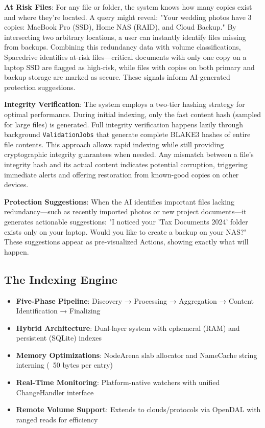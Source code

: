 \documentclass[sigconf]{acmart}
\begin{document}
\textbf{At Risk Files}: For any file or folder, the system knows how many copies exist and where they're located. A query might reveal: "Your wedding photos have 3 copies: MacBook Pro (SSD), Home NAS (RAID), and Cloud Backup." By intersecting two arbitrary locations, a user can instantly identify files missing from backups. Combining this redundancy data with volume classifications, Spacedrive identifies at-risk files—critical documents with only one copy on a laptop SSD are flagged as high-risk, while files with copies on both primary and backup storage are marked as secure. These signals inform AI-generated protection suggestions.

\textbf{Integrity Verification}: The system employs a two-tier hashing strategy for optimal performance. During initial indexing, only the fast content hash (sampled for large files) is generated. Full integrity verification happens lazily through background \texttt{ValidationJobs} that generate complete BLAKE3 hashes of entire file contents. This approach allows rapid indexing while still providing cryptographic integrity guarantees when needed. Any mismatch between a file's integrity hash and its actual content indicates potential corruption, triggering immediate alerts and offering restoration from known-good copies on other devices.

\textbf{Protection Suggestions}: When the AI identifies important files lacking redundancy—such as recently imported photos or new project documents—it generates actionable suggestions: "I noticed your 'Tax Documents 2024' folder exists only on your laptop. Would you like to create a backup on your NAS?" These suggestions appear as pre-visualized Actions, showing exactly what will happen.


\subsection{The Indexing Engine}
\label{sec:indexing-engine}

\begin{keytakeaways}
\begin{itemize}[noitemsep, topsep=0pt]
\item \textbf{Five-Phase Pipeline}: Discovery → Processing → Aggregation → Content Identification → Finalizing
\item \textbf{Hybrid Architecture}: Dual-layer system with ephemeral (RAM) and persistent (SQLite) indexes
\item \textbf{Memory Optimizations}: NodeArena slab allocator and NameCache string interning (~50 bytes per entry)
\item \textbf{Real-Time Monitoring}: Platform-native watchers with unified ChangeHandler interface
\item \textbf{Remote Volume Support}: Extends to clouds/protocols via OpenDAL with ranged reads for efficiency
\end{itemize}
\end{keytakeaways}
\end{document}
